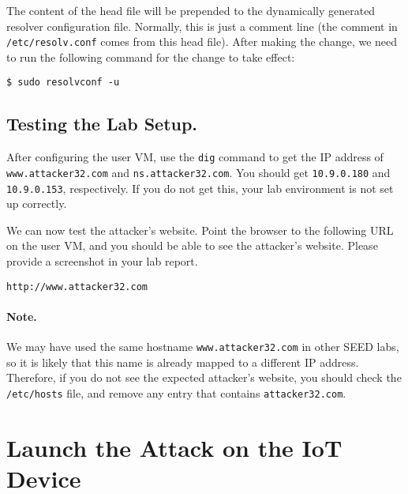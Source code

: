 The content of the head file will be prepended to the dynamically generated resolver
configuration file. Normally, this is just a comment line (the comment in
\texttt{/etc/resolv.conf} comes from this head file). After making the change,
we need to run the following command for the change to take effect: 

\begin{lstlisting}
$ sudo resolvconf -u
\end{lstlisting}




\subsection{Testing the Lab Setup.}

After configuring the user VM, use the \texttt{dig} command
to get the IP address of \texttt{www.attacker32.com}
and \texttt{ns.attacker32.com}. You should get 
\texttt{10.9.0.180} and \texttt{10.9.0.153}, respectively. 
If you do not get this, your lab environment is not 
set up correctly. 


We can now test the attacker's website. 
Point the browser to the following URL on the user VM, and you should 
be able to see the attacker's website. 
Please provide a screenshot in your lab report. 

\begin{lstlisting}
http://www.attacker32.com
\end{lstlisting}

\paragraph{Note.} We may have used the same hostname  
\texttt{www.attacker32.com} in other SEED labs, so it is likely 
that this name is already mapped to a different IP address. Therefore,
if you do not see the expected attacker's website, you should 
check the \texttt{/etc/hosts} file, and remove
any entry that contains \texttt{attacker32.com}. 




\section{Launch the Attack on the IoT Device}

